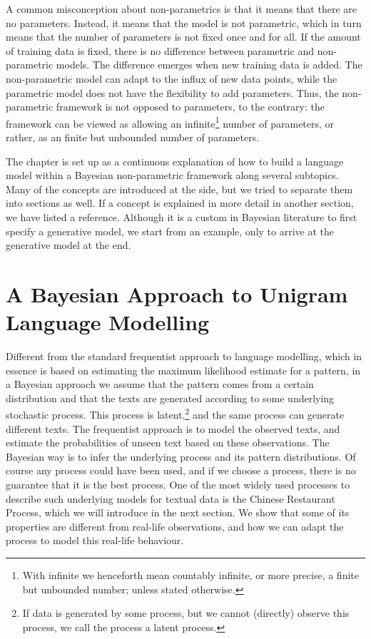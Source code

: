 A common misconception about non-parametrics is that it means that there are no parameters. Instead, it means that the model is not parametric, which in turn means that the number of parameters is not fixed once and for all. If the amount of training data is fixed, there is no difference between parametric and non-parametric models. The difference emerges when new training data is added. The non-parametric model can adapt to the influx of new data points, while the parametric model does not have the flexibility to add parameters. Thus, the non-parametric framework is not opposed to parameters, to the contrary: the framework can be viewed as allowing an infinite\footnote{With infinite we henceforth mean countably infinite, or more precise, a finite but unbounded number; unless stated otherwise.} number of parameters, or rather, as an finite but unbounded number of parameters.

The chapter is set up as a continuous explanation of how to build a language model within a Bayesian non-parametric framework along several subtopics. Many of the concepts are introduced at the side, but we tried to separate them into sections as well. If a concept is explained in more detail in another section, we have listed a reference. Although it is a custom in Bayesian literature to first specify a generative model, we start from an example, only to arrive at the generative model at the end.

\section{A Bayesian Approach to Unigram Language Modelling}

Different from the standard frequentist approach to language modelling, which in essence is based on estimating the maximum likelihood estimate for a pattern, in a Bayesian approach we assume that the pattern comes from a certain distribution and that the texts are generated according to some underlying stochastic process. This process is latent,\footnote{If data is generated by some process, but we cannot (directly) observe this process, we call the process a latent process.} and the same process can generate different texts. The frequentist approach is to model the observed texts, and estimate the probabilities of unseen text based on these observations. The Bayesian way is to infer the underlying process and its pattern distributions. Of course any process could have been used, and if we choose a process, there is no guarantee that it is the best process. One of the most widely used processes to describe such underlying models for textual data is the Chinese Restaurant Process, which we will introduce in the next section. We show that some of its properties are different from real-life observations, and how we can adapt the process to model this real-life behaviour.

